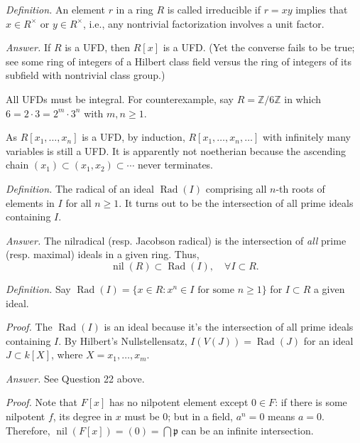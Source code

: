 \documentclass{mathproblems}
\newcommand\Z{\mathbb{Z}}
\DeclareMathOperator{\rad}{Rad}
\begin{document}
\begin{questions}
\textit{Definition.} An element $r$ in a ring $R$ is called irreducible if $r=xy$ implies that $x\in R^\times$ or $y\in R^\times$, i.e., any nontrivial factorization involves a unit factor. 

\textit{Answer.} If $R$ is a UFD, then $R[x]$ is a UFD. (Yet the converse fails to be true; see some ring of integers of a Hilbert class field versus the ring of integers of its subfield with nontrivial class group.) 

All UFDs must be integral. For counterexample, say $R=\Z/6\Z$ in which $6=2\cdot 3=2^m\cdot 3^n$ with $m,n\geq 1$.

As $R[x_1,\ldots,x_n]$ is a UFD, by induction, $R[x_1,\ldots,x_n,\ldots]$ with infinitely many variables is still a UFD. It is apparently not noetherian because the ascending chain $(x_1)\subset (x_1,x_2)\subset \cdots$ never terminates.



\textit{Definition.} The radical of an ideal $\rad (I)$ comprising all $n$-th roots of elements in $I$ for all $n\geq 1$. It turns out to be the intersection of all prime ideals containing $I$.

\textit{Answer.} The nilradical (resp. Jacobson radical) is the intersection of \textit{all} prime (resp. maximal) ideals in a given ring. Thus,
$$
\operatorname{nil}(R)\subset\rad(I),\quad \forall I\subset R.
$$


\textit{Definition.} Say $\rad(I)=\{x\in R: x^n\in I \text{ for some } n\geq 1\}$ for $I\subset R$ a given ideal.

\textit{Proof.} The $\rad(I)$ is an ideal because it's the intersection of all prime ideals containing $I$. By Hilbert's Nullstellensatz, $I(V(J))=\rad (J)$ for an ideal $J\subset k[X]$, where $X=x_1,\ldots, x_m$.


\textit{Answer.} See Question 22 above.

\textit{Proof.} Note that $F[x]$ has no nilpotent element except $0\in F$: if there is some nilpotent $f$, its degree in $x$ must be 0; but in a field, $a^n=0$ means $a=0$. Therefore, $\operatorname{nil}(F[x])=(0)=\bigcap \mathfrak{p}$ can be an infinite intersection.


\end{questions}
\end{document}
